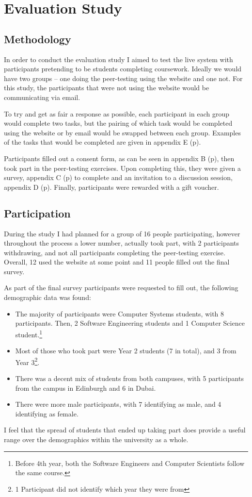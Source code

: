 \documentclass[a4paper,11pt]{report}
\begin{document}
\chapter{Evaluation Study}
\doublespacing
\label{ch:eval}
\section{Methodology}
In order to conduct the evaluation study I aimed to test the live system with participants pretending to be students completing coursework. Ideally we would have two groups -- one doing the peer-testing using the website and one not. For this study, the participants that were not using the website would be communicating via email.\par
To try and get as fair a response as possible, each participant in each group would complete two tasks, but the pairing of which task would be completed using the website or by email would be swapped between each group. Examples of the tasks that would be completed are given in appendix E (p\pageref{app:descriptors}).\par
Participants filled out a consent form, as can be seen in appendix B (p\pageref{app:consent}), then took part in the peer-testing exercises. Upon completing this, they were given a survey, appendix C (p\pageref{app:survey}) to complete and an invitation to a discussion session, appendix D (p\pageref{app:discussion}). Finally, participants were rewarded with a gift voucher.

\section{Participation}
During the study I had planned for a group of 16 people participating, however throughout the process a lower number, actually took part, with 2 participants withdrawing, and not all participants completing the peer-testing exercise. Overall, 12 used the website at some point and 11 people filled out the final survey.\par
As part of the final survey participants were requested to fill out, the following demographic data was found:
\begin{itemize}
\item The majority of participants were Computer Systems students, with 8 participants. Then, 2 Software Engineering students and 1 Computer Science student.\footnote{Before 4th year, both the Software Engineers and Computer Scientists follow the same course.}
\item Most of those who took part were Year 2 students (7 in total), and 3 from Year 3\footnote{1 Participant did not identify which year they were from}. 
\item There was a decent mix of students from both campuses, with 5 participants from the campus in Edinburgh and 6 in Dubai.
\item There were more male participants, with 7 identifying as male, and 4 identifying as female.
\end{itemize}
I feel that the spread of students that ended up taking part does provide a useful range over the demographics within the university as a whole.
\end{document}
